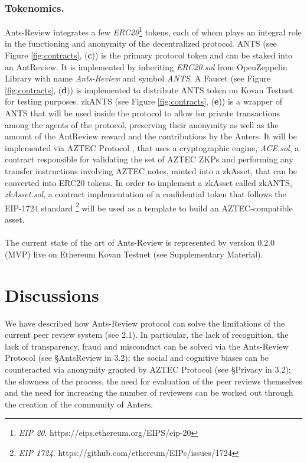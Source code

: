 \documentclass[runningheads]{llncs}
\begin{document}
\subsubsection{Tokenomics.}
Ants-Review integrates a few \emph{ERC20}\footnote[12]{\emph{EIP 20}. https://eips.ethereum.org/EIPS/eip-20} tokens, each of whom plays an integral role in the functioning and anonymity of the decentralized protocol. ANTS (see Figure \ref{fig:contracts}, (\textbf{c})) is the primary protocol token and can be staked into an AntReview. It is implemented by inheriting \emph{ERC20.sol} from OpenZeppelin Library with name \emph{Ants-Review} and symbol \emph{ANTS}.
A Faucet (see Figure \ref{fig:contracts}, (\textbf{d})) is implemented to distribute ANTS token on Kovan Testnet for testing purposes. zkANTS (see Figure \ref{fig:contracts}, (\textbf{e})) is a wrapper of ANTS that will be used inside the protocol to allow for private transactions among the agents of the protocol, preserving their anonymity as well as the amount of the AntReview reward and the contributions by the Anters. It will be implemented via AZTEC Protocol \cite{AZTEC}, that uses a cryptographic engine, \emph{ACE.sol}, a contract responsible for validating the set of AZTEC ZKPs and performing any transfer instructions involving AZTEC notes, minted into a zkAsset, that can be converted into ERC20 tokens. In order to implement a zkAsset called zkANTS, \emph{zkAsset.sol}, a contract implementation of a confidential token that follows the EIP-1724 standard \footnote[13]{\emph{EIP  1724}. https://github.com/ethereum/EIPs/issues/1724} will be used as a template to build an AZTEC-compatible asset.
\\
\\ The current state of the art of Ants-Review is represented by version 0.2.0 (MVP) live on Ethereum Kovan Testnet (see Supplementary Material).

\section{Discussions}
We have described how Ants-Review protocol can solve the limitations of the current peer review system (see 2.1). In particular, the lack of recognition, the lack of transparency, fraud and misconduct can be solved via the Ants-Review Protocol (see §AntsReview in 3.2); the social and cognitive biases can be counteracted via anonymity granted by AZTEC Protocol (see §Privacy in 3.2); the slowness of the process, the need for evaluation of the peer reviews themselves and the need for increasing the number of reviewers can be worked out through the creation of the community of Anters. 
\end{document}
